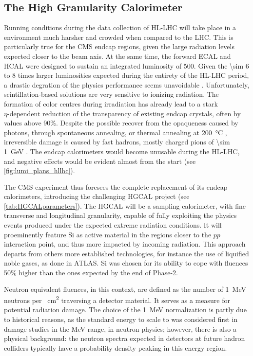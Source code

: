 \documentclass[11pt]{article}
\begin{document}
\subsection{The High Granularity Calorimeter}
\label{sec:org775888d}
\label{sec:hgcal_intro}

Running conditions during the data collection of \ac{HL-LHC} will take place in a environment much harsher and crowded when compared to the \ac{LHC}.
This is particularly true for the \ac{CMS} endcap regions, given the large radiation levels expected closer to the beam axis.
At the same time, the forward \ac{ECAL} and \ac{HCAL} were designed to sustain an integrated luminosity of \SI{500}{\invfb}.
Given the \num{\sim 6} to \num{8} times larger luminosities expected during the entirety of the \ac{HL-LHC} period, a drastic degration of the physics performance seems unavoidable \cite{hgcal_technical_proposal}.
Unfortunately, scintillation-based solutions are very sensitive to ionizing radiation.
The formation of color centres during irradiation has already lead to a stark \(\eta\text{-dependent}\) reduction of the transparency of existing endcap  crystals, often by values above 90\%.
Despite the possible recover from the opaqueness caused by photons, through spontaneous annealing, or thermal annealing at \SI{200}{\celsius} \cite{annealing_calorimeter}, irreversible damage is caused by fast hadrons, mostly charged pions of \SI{\sim 1}{\GeV} \cite{wigmans,wigmans2}.
The endcap calorimeters would become unusable during the \ac{HL-LHC}, and negative effects would be evident almost from the start (see \cref{fig:lumi_plans_hllhc}).

The CMS experiment thus foresees the complete replacement of its endcap calorimeters, introducing the challenging \ac{HGCAL} project \cite{hgcalTDR} (see \cref{tab:HGCALparameters}).
The \ac{HGCAL} will be a sampling calorimeter, with fine transverse and longitudinal granularity, capable of fully exploiting the physics events produced under the expected extreme radiation conditions.
It will proeminently feature \ac{Si} as active material in the regions closer to the \(pp\) interaction point, and thus more impacted by incoming radiation.
This approach departs from others more established technologies, for instance the use of liquified noble gases, as done in \ac{ATLAS}.
\ac{Si} was chosen for its ability to cope with fluences 50\% higher than the ones expected by the end of Phase-2.

Neutron equivalent fluences, in this context, are defined as the number of \SI{1}{\MeV} neutrons per \si{\per\cm\squared} traversing a detector material.
It serves as a measure for potential radiation damage.
The choice of the \SI{1}{\MeV} normalization is partly due to historical reasons, as the standard energy to scale to was considered first in damage studies in the MeV range, in neutron physics; however, there is also a physical background: the neutron spectra expected in detectors at future hadron colliders typically have a probability density peaking in this energy region. 
\end{document}
